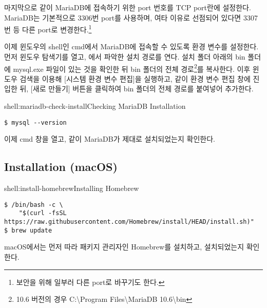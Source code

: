 마지막으로 \와 같이 MariaDB에 접속하기 위한 port 번호를 TCP port란에 설정한다. MariaDB는 기본적으로 3306번 port를 사용하며, 여타 이유로 선점되어 있다면 3307번 등 다른 port로 변경한다.\footnote{보안을 위해 일부러 다른 port로 바꾸기도 한다.}


이제 윈도우의 shell인 cmd에서 MariaDB에 접속할 수 있도록 환경 변수를 설정한다. 먼저 윈도우 탐색기를 열고, 에서 파악한 설치 경로를 연다. 설치 폴더 아래의 bin 폴더에 mysql.exe 파일이 있는 것을 확인한 뒤 bin 폴더의 전체 경로\footnote{10.6 버전의 경우 C:\textbackslash{}Program Files\textbackslash{}MariaDB 10.6\textbackslash{}bin}를 복사한다. 이후 윈도우 검색을 이용해 [시스템 환경 변수 편집]을 실행하고, \과 같이 환경 변수 편집 창에 진입한 뒤, [새로 만들기] 버튼을 클릭하여 bin 폴더의 전체 경로를 붙여넣어 추가한다.

\begin{shellenv}{shell:mariadb-check-install}{Checking MariaDB Installation}\begin{verbatim}
$ mysql --version
\end{verbatim}
\end{shellenv}

이제 cmd 창을 열고, \와 같이 MariaDB가 제대로 설치되었는지 확인한다.

\subsection*{Installation (macOS)}

\begin{shellenv}{shell:install-homebrew}{Installing Homebrew}\begin{verbatim}
$ /bin/bash -c \
    "$(curl -fsSL https://raw.githubusercontent.com/Homebrew/install/HEAD/install.sh)"
$ brew update
\end{verbatim}
\end{shellenv}

macOS에서는 먼저 \를 따라 패키지 관리자인 Homebrew를 설치하고, 설치되었는지 확인한다.

